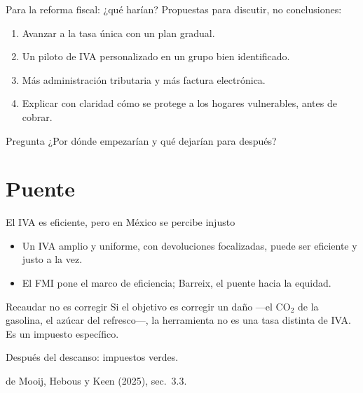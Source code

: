 \documentclass[aspectratio=169,11pt]{beamer}
\newcommand{\fuente}[1]{\par\vfill{\small\color{cGris}#1\par}}
\begin{document}
\begin{frame}{Para la reforma fiscal: ¿qué harían?}
  Propuestas para discutir, no conclusiones:
  \begin{enumerate}
    \item Avanzar a la tasa única con un plan gradual.
    \item Un piloto de IVA personalizado en un grupo bien identificado.
    \item Más administración tributaria y más factura electrónica.
    \item Explicar con claridad cómo se protege a los hogares vulnerables, antes de cobrar.
  \end{enumerate}
  \pause
  \begin{alertblock}{Pregunta}
    ¿Por dónde empezarían y qué dejarían para después?
  \end{alertblock}
\end{frame}

\section{Puente}

\begin{frame}{El IVA es eficiente, pero en México se percibe injusto}
  \begin{itemize}
    \item Un IVA amplio y uniforme, con devoluciones focalizadas, puede ser eficiente y justo a la vez.
    \pause
    \item El FMI pone el marco de eficiencia; Barreix, el puente hacia la equidad.
  \end{itemize}
  \pause
  \begin{alertblock}{Recaudar no es corregir}
    Si el objetivo es corregir un daño ---el CO$_2$ de la gasolina, el azúcar del refresco---, la herramienta no es una tasa distinta de IVA. Es un impuesto específico.
  \end{alertblock}
  \pause
  \centering\large Después del descanso: impuestos verdes.
  \fuente{de Mooij, Hebous y Keen (2025), sec.~3.3.}
\end{frame}
\end{document}
